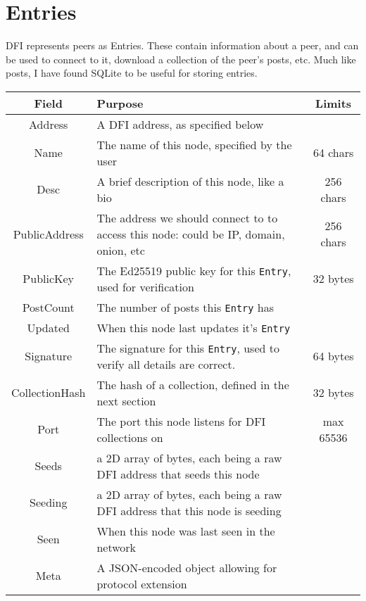 \section{Entries}
DFI represents peers as Entries. These contain information about a peer, and can
be used to connect to it, download a collection of the peer's posts, etc. Much
like posts, I have found SQLite to be useful for storing entries.\\

\begin{minipage}{\linewidth}
\begin{center}
\begin{tabular}{ c|p{6cm}|c }
	\textbf{Field} & \textbf{Purpose} & \textbf{Limits} \\  
	\hline
	Address        & A DFI address, as specified below \\
	\hline
	Name           & The name of this node, specified by the user & 64 chars \\
	\hline
	Desc           & A brief description of this node, like a bio & 256 chars \\
	\hline
	PublicAddress  & The address we should connect to to access this node:
	                 could be IP, domain, onion, etc
				   & 256 chars \\
	\hline
	PublicKey      & The Ed25519 public key for this \texttt{Entry}, used for verification
	               & 32 bytes \\
	\hline
	PostCount      & The number of posts this \texttt{Entry} has \\
	\hline
	Updated        & When this node last updates it's \texttt{Entry} \\
	\hline
	Signature      & The signature for this \texttt{Entry}, used to verify all details
	                 are correct. & 64 bytes \\
	\hline
	CollectionHash & The hash of a collection, defined in the next section & 32
	bytes \\
	\hline
	Port           & The port this node listens for DFI collections on & max
	65536 \\
	\hline
	Seeds          & a 2D array of bytes, each being a raw DFI address that
	seeds this node \\
	\hline
	Seeding        & a 2D array of bytes, each being a raw DFI address that this
	node is seeding \\
	\hline
	Seen           & When this node was last seen in the network \\
	\hline
	Meta           & A JSON-encoded object allowing for protocol extension \\
	\hline

\end{tabular}
\end{center}
\end{minipage}

